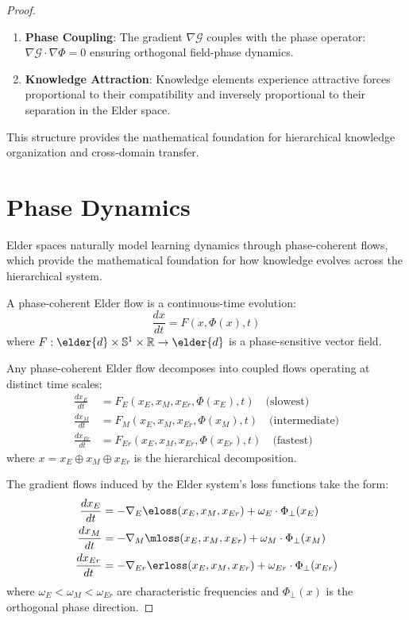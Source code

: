 \begin{proof}
\begin{theorem}
\begin{enumerate}
    \item \textbf{Phase Coupling}: The gradient $\nabla \mathcal{G}$ couples with the phase operator: $\nabla \mathcal{G} \cdot \nabla \Phi = 0$ ensuring orthogonal field-phase dynamics.
    
    \item \textbf{Knowledge Attraction}: Knowledge elements experience attractive forces proportional to their compatibility and inversely proportional to their separation in the Elder space.
\end{enumerate}
This structure provides the mathematical foundation for hierarchical knowledge organization and cross-domain transfer.
\end{theorem}

\section{Phase Dynamics}

Elder spaces naturally model learning dynamics through phase-coherent flows, which provide the mathematical foundation for how knowledge evolves across the hierarchical system.

\begin{definition}
A phase-coherent Elder flow is a continuous-time evolution:
\begin{equation}
\frac{dx}{dt} = F(x, \Phi(x), t)
\end{equation}
where $F: \elder{d} \times \mathbb{S}^1 \times \mathbb{R} \rightarrow \elder{d}$ is a phase-sensitive vector field.
\end{definition}

\begin{theorem}
\label{thm:elder-flow-decomposition}
Any phase-coherent Elder flow decomposes into coupled flows operating at distinct time scales:
\begin{align}
\frac{dx_E}{dt} &= F_E(x_E, x_M, x_{Er}, \Phi(x_E), t) \quad \text{(slowest)}\\
\frac{dx_M}{dt} &= F_M(x_E, x_M, x_{Er}, \Phi(x_M), t) \quad \text{(intermediate)}\\
\frac{dx_{Er}}{dt} &= F_{Er}(x_E, x_M, x_{Er}, \Phi(x_{Er}), t) \quad \text{(fastest)}
\end{align}
where $x = x_E \oplus x_M \oplus x_{Er}$ is the hierarchical decomposition.
\end{theorem}

The gradient flows induced by the Elder system's loss functions take the form:
\begin{align}
\frac{dx_E}{dt} &= -\nabla_E \eloss(x_E, x_M, x_{Er}) + \omega_E \cdot \Phi_{\perp}(x_E)\\
\frac{dx_M}{dt} &= -\nabla_M \mloss(x_E, x_M, x_{Er}) + \omega_M \cdot \Phi_{\perp}(x_M)\\
\frac{dx_{Er}}{dt} &= -\nabla_{Er} \erloss(x_E, x_M, x_{Er}) + \omega_{Er} \cdot \Phi_{\perp}(x_{Er})
\end{align}
where $\omega_E < \omega_M < \omega_{Er}$ are characteristic frequencies and $\Phi_{\perp}(x)$ is the orthogonal phase direction.


\end{proof}
